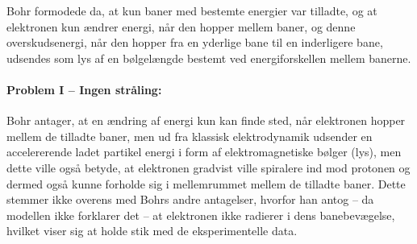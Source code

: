 Bohr formodede da, at kun baner med bestemte energier var tilladte, og at elektronen kun ændrer energi, når den hopper mellem baner, og denne overskudsenergi, når den hopper fra en yderlige bane til en inderligere bane, udsendes som lys af en bølgelængde bestemt ved energiforskellen mellem banerne.

\paragraph{Problem I -- Ingen stråling:} Bohr antager, at en ændring af energi kun kan finde sted, når elektronen hopper mellem de tilladte baner, men ud fra klassisk elektrodynamik udsender en accelererende ladet partikel energi i form af elektromagnetiske bølger (lys), men dette ville også betyde, at elektronen gradvist ville spiralere ind mod protonen og dermed også kunne forholde sig i mellemrummet mellem de tilladte baner. Dette stemmer ikke overens med Bohrs andre antagelser, hvorfor han antog -- da modellen ikke forklarer det -- at elektronen ikke radierer i dens banebevægelse, hvilket viser sig at holde stik med de eksperimentelle data.


